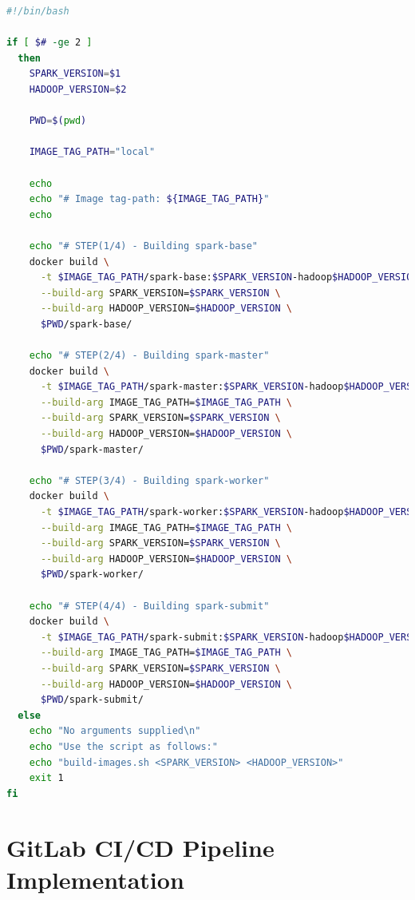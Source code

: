 \begin{lstlisting}[label=lst:appendix_spark-build-script, caption=Build script for all Apache Spark images, language=sh]
#!/bin/bash
 
if [ $# -ge 2 ]
  then
    SPARK_VERSION=$1
    HADOOP_VERSION=$2
 
    PWD=$(pwd)
 
    IMAGE_TAG_PATH="local"
 
    echo
    echo "# Image tag-path: ${IMAGE_TAG_PATH}"
    echo
 
    echo "# STEP(1/4) - Building spark-base"
    docker build \
      -t $IMAGE_TAG_PATH/spark-base:$SPARK_VERSION-hadoop$HADOOP_VERSION \
      --build-arg SPARK_VERSION=$SPARK_VERSION \
      --build-arg HADOOP_VERSION=$HADOOP_VERSION \
      $PWD/spark-base/
 
    echo "# STEP(2/4) - Building spark-master"
    docker build \
      -t $IMAGE_TAG_PATH/spark-master:$SPARK_VERSION-hadoop$HADOOP_VERSION \
      --build-arg IMAGE_TAG_PATH=$IMAGE_TAG_PATH \
      --build-arg SPARK_VERSION=$SPARK_VERSION \
      --build-arg HADOOP_VERSION=$HADOOP_VERSION \
      $PWD/spark-master/
 
    echo "# STEP(3/4) - Building spark-worker"
    docker build \
      -t $IMAGE_TAG_PATH/spark-worker:$SPARK_VERSION-hadoop$HADOOP_VERSION \
      --build-arg IMAGE_TAG_PATH=$IMAGE_TAG_PATH \
      --build-arg SPARK_VERSION=$SPARK_VERSION \
      --build-arg HADOOP_VERSION=$HADOOP_VERSION \
      $PWD/spark-worker/
 
    echo "# STEP(4/4) - Building spark-submit"
    docker build \
      -t $IMAGE_TAG_PATH/spark-submit:$SPARK_VERSION-hadoop$HADOOP_VERSION \
      --build-arg IMAGE_TAG_PATH=$IMAGE_TAG_PATH \
      --build-arg SPARK_VERSION=$SPARK_VERSION \
      --build-arg HADOOP_VERSION=$HADOOP_VERSION \
      $PWD/spark-submit/
  else
    echo "No arguments supplied\n"
    echo "Use the script as follows:"
    echo "build-images.sh <SPARK_VERSION> <HADOOP_VERSION>"
    exit 1
fi
\end{lstlisting}


\section{GitLab CI/CD Pipeline Implementation}

